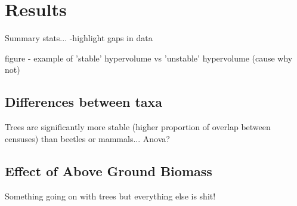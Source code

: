 
\section{Results}


Summary stats... -highlight gaps in data

figure - example of 'stable' hypervolume vs 'unstable' hypervolume (cause why not)

\subsection{Differences between taxa}

Trees are significantly more stable (higher proportion of overlap between censuses) than beetles or mammals...
Anova?

\subsection{Effect of Above Ground Biomass}
Something going on with trees but everything else is shit!
